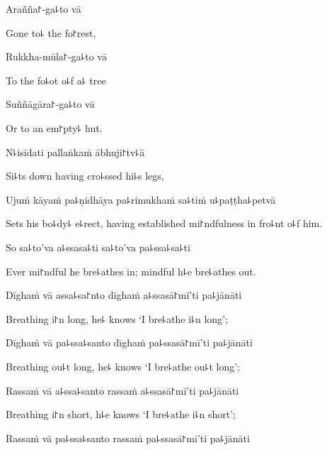 Arañña꜓-ga꜕to vā

\begin{english}
  Gone to꜕ the fo꜓rest,
\end{english}

Rukkha-mūla꜓-ga꜕to vā

\begin{english}
  To the fo꜕ot o꜕f a꜕ tree
\end{english}

Suññāgāra꜓-ga꜕to vā

\begin{english}
  Or to an em꜓pty꜕ hut.
\end{english}

N꜕isīdati pallaṅkaṁ ābhuji꜓tv꜕ā

\begin{english}
  Si꜕ts down having cro꜕ssed hi꜕s legs,
\end{english}

Ujuṁ kāyaṁ pa꜕ṇidhāya pa꜕rimukhaṁ sa꜕tiṁ u꜕paṭṭha꜕petvā

\begin{english}
  Sets his bo꜕dy꜕ e꜕rect, having established mi꜓ndfulness in fro꜕nt o꜕f him.
\end{english}

So sa꜕to'va a꜕ssasa꜕ti sa꜕to'va pa꜕ssa꜕sa꜕ti

\begin{english}
  Ever mi꜓ndful he bre꜕athes in; mindful h꜕e bre꜕athes out.
\end{english}

\ifaivedition
\clearpage
\fi

Dīghaṁ vā assa꜕sa꜓nto dīghaṁ a꜕ssasā꜓mī'ti pa꜕jānāti

\begin{english}
  Breathing i꜓n long, he꜕ knows `I bre꜕athe i꜕n long';
\end{english}

Dīghaṁ vā pa꜕ssa꜕santo dīghaṁ pa꜕ssasā꜓mī'ti pa꜕jānāti

\begin{english}
  Breathing ou꜕t long, he꜕ knows `I bre꜕athe ou꜕t long';
\end{english}

Rassaṁ vā a꜕ssa꜕santo rassaṁ a꜕ssasā꜓mī'ti pa꜕jānāti

\begin{english}
  Breathing i꜓n short, h꜕e knows `I bre꜕athe i꜕n short';
\end{english}

Rassaṁ vā pa꜕ssa꜕santo rassaṁ pa꜕ssasā꜓mī'ti pa꜕jānāti


